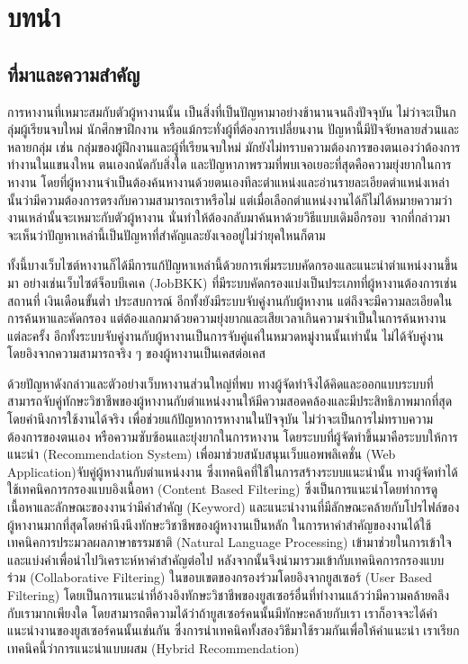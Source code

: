 \chapter{บทนำ}
\label{chapter:introduction}

\section{ที่มาและความสำคัญ}

การหางานที่เหมาะสมกับตัวผู้หางานนั้น เป็นสิ่งที่เป็นปัญหามาอย่างช้านานจนถึงปัจจุบัน ไม่ว่าจะเป็นกลุ่มผู้เรียนจบใหม่ นักศึกษาฝึกงาน หรือแม้กระทั่งผู้ที่ต้องการเปลี่ยนงาน ปัญหานี้มีปัจจัยหลายส่วนและหลายกลุ่ม เช่น กลุ่มของผู้ฝึกงานและผู้ที่เรียนจบใหม่ มักยังไม่ทราบความต้องการของตนเองว่าต้องการทำงานในแขนงใหน ตนเองถนัดกับสิ่งใด และปัญหาภาพรวมที่พบเจอเยอะที่สุดคือความยุ่งยากในการหางาน โดยที่ผู้หางานจำเป็นต้องค้นหางานด้วยตนเองทีละตำแหน่งและอ่านรายละเอียดตำแหน่งเหล่านั้นว่ามีความต้องการตรงกับความสามารถเราหรือไม่ แต่เมื่อเลือกตำแหน่งงานได้ก็ไม่ได้หมายความว่างานเหล่านั้นจะเหมาะกับตัวผู้หางาน นั่นทำให้ต้องกลับมาค้นหาด้วยวิธีแบบเดิมอีกรอบ จากที่กล่าวมาจะเห็นว่าปัญหาเหล่านี้เป็นปัญหาที่สำคัญและยังเจออยู่ไม่ว่ายุคใหนก็ตาม

ทั้งนี้บางเว็บไซต์หางานก็ได้มีการแก้ปัญหาเหล่านี้ด้วยการเพิ่มระบบคัดกรองและแนะนำตำแหน่งงานขึ้นมา อย่างเช่นเว็บไซต์จ็อบบีเคเค (JobBKK) ที่มีระบบคัดกรองแบ่งเป็นประเภทที่ผู้หางานต้องการเช่น สถานที่ เงินเดือนขั้นต่ำ ประสบการณ์ อีกทั้งยังมีระบบจับคู่งานกับผู้หางาน แต่ถึงจะมีความละเอียดในการค้นหาและคัดกรอง แต่ต้องแลกมาด้วยความยุ่งยากและเสียเวลาเกินความจำเป็นในการค้นหางานแต่ละครั้ง อีกทั้งระบบจับคู่งานกับผู้หางานเป็นการจับคู่แค่ในหมวดหมู่งานนั้นเท่านั้น ไม่ได้จับคู่งานโดยอิงจากความสามารถจริง ๆ ของผู้หางานเป็นเคสต่อเคส

ด้วยปัญหาดังกล่าวและตัวอย่างเว็บหางานส่วนใหญ่ที่พบ ทางผู้จัดทำจึงได้คิดและออกแบบระบบที่สามารถจับคู่ทักษะวิชาชีพของผู้หางานกับตำแหน่งงานให้มีความสอดคล้องและมีประสิทธิภาพมากที่สุด โดยคำนึงการใช้งานได้จริง เพื่อช่วยแก้ปัญหาการหางานในปัจจุบัน ไม่ว่าจะเป็นการไม่ทราบความต้องการของตนเอง หรือความซับซ้อนและยุ่งยากในการหางาน โดยระบบที่ผู้จัดทำขึ้นมาคือระบบให้การแนะนำ (Recommendation System) เพื่อมาช่วยสนับสนุนเว็บแอพพลิเคชั่น (Web Application)จับคู่ผู้หางานกับตำแหน่งงาน ซึ่งเทคนิคที่ใช้ในการสร้างระบบแนะนำนั้น ทางผู้จัดทำได้ใช้เทคนิคการกรองแบบอิงเนื้อหา (Content Based Filtering) ซึ่งเป็นการแนะนำโดยทำการดูเนื้อหาและลักษณะของงานว่ามีคำสำคัญ (Keyword) และแนะนำงานที่มีลักษณะคล้ายกับโปรไฟล์ของผู้หางานมากที่สุดโดยคำนึงนึงทักษะวิชาชีพของผู้หางานเป็นหลัก ในการหาคำสำคัญของงานได้ใช้เทคนิคการประมวลผลภาษาธรรมชาติ (Natural Language Processing) เข้ามาช่วยในการเข้าใจและแบ่งคำเพื่อนำไปวิเคราะห์หาคำสำคัญต่อไป หลังจากนั้นจึงนำมารวมเข้ากับเทคนิคการกรองแบบร่วม (Collaborative Filtering) ในขอบเขตของกรองร่วมโดยอิงจากยูสเซอร์ (User Based Filtering) โดยเป็นการแนะนำที่อ้างอิงทักษะวิชาชีพของยูสเซอร์อื่นที่ทำงานแล้วว่ามีความคล้ายคลึงกับเรามากเพียงใด โดยสามารถตีความได้ว่าถ้ายูสเซอร์คนนั้นมีทักษะคล้ายกับเรา เราก็อาจจะได้คำแนะนำงานของยูสเซอร์คนนั้นเช่นกัน ซึ่งการนำเทคนิคทั้งสองวิธีมาใช้รวมกันเพื่อให้คำแนะนำ เราเรียกเทคนิคนี้ว่าการแนะนำแบบผสม (Hybrid Recommendation)

